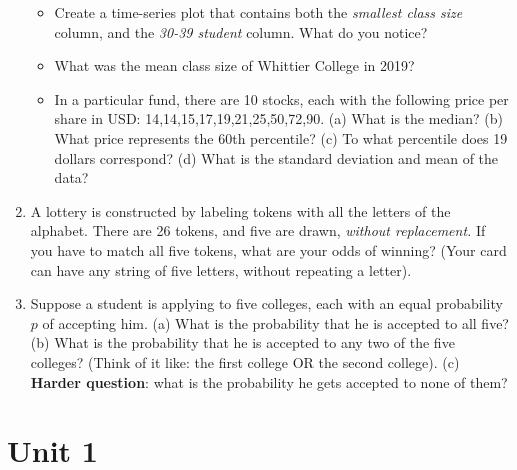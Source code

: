 \documentclass{article}
\begin{document}
\begin{enumerate}
\begin{itemize}
\item Create a time-series plot that contains both the \textit{smallest class size} column, and the \textit{30-39 student} column.  What do you notice? \\ \vspace{2cm}
\item What was the mean class size of Whittier College in 2019? \\ \vspace{1cm}
\item In a particular fund, there are 10 stocks, each with the following price per share in USD: 14,14,15,17,19,21,25,50,72,90.  (a) What is the median?  (b) What price represents the 60th percentile? (c) To what percentile does 19 dollars correspond? (d) What is the standard deviation and mean of the data? \\ \vspace{2cm}
\end{itemize}
\item A lottery is constructed by labeling tokens with all the letters of the alphabet.  There are 26 tokens, and five are drawn, \textit{without replacement.}  If you have to match all five tokens, what are your odds of winning?  (Your card can have any string of five letters, without repeating a letter). \\ \vspace{1cm}
\item Suppose a student is applying to five colleges, each with an equal probability $p$ of accepting him.  (a) What is the probability that he is accepted to all five?  (b) What is the probability that he is accepted to any two of the five colleges? (Think of it like: the first college OR the second college). (c) \textbf{Harder question}: what is the probability he gets accepted to none of them? \\ \vspace{1cm}
\end{enumerate}

\section{Unit 1}
\end{document}
